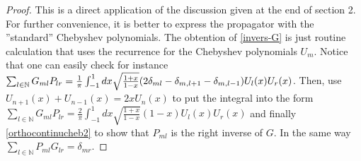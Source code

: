 \documentclass[a4paper,11pt,twoside]{article}
\numberwithin{equation}{section}
\theoremstyle{nonumberplain}
\newtheorem{proof}{Proof}
\begin{document}
\begin{proof}
This is a direct application of the discussion given at the end of section 2. For further convenience, it is better to express the propagator with the ''standard'' Chebyshev polynomials. The obtention of \eqref{invers-G} is just routine calculation that uses the recurrence for the Chebyshev polynomials $U_m$. Notice that one can easily check for instance $\sum_{l\in\mathbb{N}}G_{ml}P_{lr}={{1}\over{\pi}}\int_{-1}^1dx{\sqrt{\frac{1+x}{1-x}}}(2\delta_{ml}-\delta_{m,l+1}-\delta_{m,l-1})U_l(x)U_r(x)$. Then, use $U_{n+1}(x)+U_{n-1}(x)=2xU_n(x)$ to put the integral into the form $\sum_{l\in\mathbb{N}}G_{ml}P_{lr}=\frac{2}{\pi}\int_{-1}^1dx{\sqrt{\frac{1+x}{1-x}}}(1-x)U_l(x)U_r(x)$ and finally \eqref{orthocontinucheb2} to show that $P_{ml}$ is the right inverse of $G$. In the same way $\sum_{l\in\mathbb{N}}P_{ml}G_{lr}=\delta_{mr}$.
\end{proof}
\end{document}
